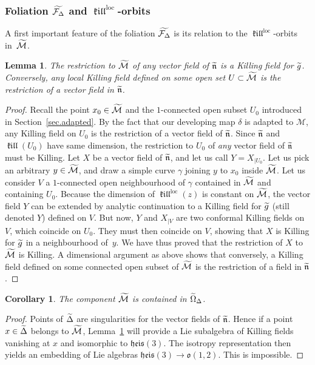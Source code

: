 \documentclass[11pt]{article}
\newtheorem{lemm}[theo]{Lemma}
\newtheorem{coro}[theo]{Corollary}
\theoremstyle{definition}
\numberwithin{equation}{section}
\numberwithin{figure}{section}
\numberwithin{table}{section}
\DeclareMathOperator{\loc}{loc}
\DeclareMathOperator{\kil}{{\mathfrak{kill}}}
\newcommand{\kiloc}{\kil^{\loc}}
\newcommand{\calm}{\mathcal{M}}
\newcommand{\tcalm}{\tilde{\mathcal{M}}}
\newcommand{\tcalfd}{\tilde{{\mathcal{F}_{\Delta}}}}
\newcommand{\tlien}{\tilde{\mathfrak{n}}}
\newcommand{\oo}{{\mathfrak{o}}}
\let\oldtilde\tilde
\renewcommand*\tilde[1]{\mathchoice{\widetilde{#1}}{\widetilde{#1}}{\widetilde{#1}}{\oldtilde{#1}}}
\begin{document}
\subsubsection{Foliation \texorpdfstring{$\tcalfd$}{tcalfd} and \texorpdfstring{$\kiloc$}{kiloc}-orbits}\label{sec.folorbits}
A first important feature of the foliation $\tcalfd$ is its relation to the $\kiloc$-orbits in~$\tcalm$.


\begin{lemm}\label{lem.coincidence}
The restriction to $\tcalm$ of any vector field of $\tlien$ is a Killing field for $\tilde{g}$. Conversely, any local Killing field defined on some open set $U \subset \tcalm$ is the restriction of a vector field in $\tlien$.
\end{lemm}

\begin{proof}
Recall the point $x_0 \in \tcalm$ and the $1$-connected open subset $U_0$ introduced in Section~\ref{sec.adapted}. By the fact that our developing map $\delta$ is adapted to $\calm$, any Killing field on $U_0$ is the restriction of a vector field of $\tlien$. Since $\tlien$ and $\kil(U_0)$ have same dimension, the restriction to $U_0$ of \emph{any} vector field of $ \tlien$ must be Killing. Let $X$ be a vector field of $\tlien$, and let us call $Y=X_{|U_0}$. Let us pick an arbitrary $y \in \tcalm$, and draw a simple curve $\gamma$ joining $y$ to $x_0$ inside $\tcalm$. Let us consider $V$ a \linebreak$1$-connected open neighbourhood of $\gamma$ contained in $\tcalm$ and containing $U_0$. Because the dimension of $\kiloc(z)$ is constant on $\tcalm$, the vector field $Y$ can be extended by analytic continuation to a Killing field for $\tilde{g}$ (still denoted $Y$) defined on $V$. But now, $Y$ and $X_{|V}$ are two conformal Killing fields on $V$, which coincide on $U_0$. They must then coincide on $V$, showing that $X$ is Killing for $\tilde{g}$ in a neighbourhood of~$y$. We have thus proved that the restriction of $X$ to $\tcalm$ is Killing. A dimensional argument as above shows that conversely, a Killing field defined on some connected open subset of $\tcalm$ is the restriction of a field in $\tlien$.
\end{proof}


\begin{coro}\label{coro.nonsingulier}
The component $\tcalm$ is contained in $\tilde{\Omega}_{\Delta}$.
\end{coro}

\begin{proof}
Points of $\tilde{\Delta}$ are singularities for the vector fields of $\tlien$. Hence if a point $x \in \tilde{\Delta}$ belongs to $\tcalm$, Lemma~\ref{lem.coincidence} will provide a Lie subalgebra of Killing fields vanishing at $x$ and isomorphic to ${\mathfrak{heis}}(3)$. The isotropy representation then yields an embedding of Lie algebras ${\mathfrak{heis}}(3) \to \oo(1,2)$. This is impossible.
\end{proof}
\end{document}
